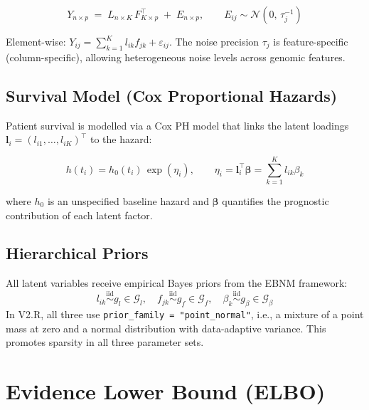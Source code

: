 \documentclass[11pt]{article}
\begin{document}
\begin{equation}\label{eq:genomics-model}
  Y_{n\times p} \;=\; L_{n\times K}\,F^{\top}_{K\times p} \;+\; E_{n\times p},
  \qquad E_{ij} \sim \mathcal{N}\!\left(0,\,\tau_{j}^{-1}\right)
\end{equation}

Element-wise: $Y_{ij} = \sum_{k=1}^K l_{ik} f_{jk} + \varepsilon_{ij}$.
The noise precision $\tau_j$ is feature-specific (column-specific), allowing
heterogeneous noise levels across genomic features.

\subsection{Survival Model (Cox Proportional Hazards)}

Patient survival is modelled via a Cox PH model that links the latent
loadings $\bm{l}_i = (l_{i1},\ldots,l_{iK})^{\top}$ to the hazard:

\begin{equation}\label{eq:survival-model}
  h(t_i) = h_0(t_i)\,\exp\!\left(\eta_i\right), \qquad
  \eta_i = \bm{l}_i^{\top}\bm{\beta} = \sum_{k=1}^K l_{ik}\beta_k
\end{equation}

where $h_0$ is an unspecified baseline hazard and $\bm{\beta}$ quantifies the
prognostic contribution of each latent factor.

\subsection{Hierarchical Priors}

All latent variables receive empirical Bayes priors from the EBNM framework:
\[
  l_{ik} \overset{\text{iid}}{\sim} g_l \in \mathcal{G}_l, \quad
  f_{jk} \overset{\text{iid}}{\sim} g_f \in \mathcal{G}_f, \quad
  \beta_k  \overset{\text{iid}}{\sim} g_\beta \in \mathcal{G}_\beta
\]
In V2.R, all three use \texttt{prior\_family = "point\_normal"}, i.e.,
a mixture of a point mass at zero and a normal distribution with
data-adaptive variance.  This promotes sparsity in all three parameter sets.

\section{Evidence Lower Bound (ELBO)}\label{sec:elbo}
\end{document}
